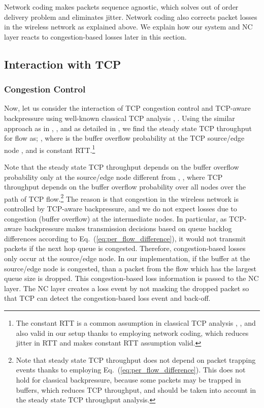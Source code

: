\documentclass[conference]{IEEEtran}
\begin{document}
Network coding makes packets sequence agnostic, which solves out of order delivery problem and eliminates jitter. Network coding also corrects packet losses in the wireless network as explained above. We explain how our system and NC layer reacts to congestion-based losses later in this section.








\subsection{Interaction with TCP}

\subsubsection{Congestion Control}
Now, let us consider the interaction of TCP congestion control and TCP-aware backpressure using well-known classical TCP analysis \cite{twsly_tcp}, \cite{low_tcp}. Using the similar approach as in \cite{twsly_tcp}, \cite{low_tcp}, and as detailed in \cite{tcp_aware_bp_tech_rep}, we find the steady state TCP throughput for flow  as; , where  is the buffer overflow probability at the TCP source/edge node , and  is constant RTT.\footnote{\scriptsize The constant RTT is a common assumption in classical TCP analysis \cite{twsly_tcp}, \cite{low_tcp}, and also valid in our setup thanks to employing network coding, which reduces jitter in RTT and makes constant RTT assumption valid.}

Note that the steady state TCP throughput depends on the buffer overflow probability only at the source/edge node different from \cite{twsly_tcp}, \cite{low_tcp}, where TCP throughput depends on the buffer overflow probability over all nodes over the path of TCP flow.\footnote{\scriptsize Note that steady state TCP throughput does not depend on packet trapping events thanks to employing Eq.~(\ref{eq:per_flow_difference}). This does not hold for classical backpressure, because some packets may be trapped in buffers, which reduces TCP throughput, and should be taken into account in the steady state TCP throughput analysis.} The reason is that congestion in the wireless network is controlled by TCP-aware backpressure, and we do not expect losses due to congestion (buffer overflow) at the intermediate nodes. In particular, as TCP-aware backpressure makes transmission decisions based on queue backlog differences according to Eq.~(\ref{eq:per_flow_difference}), it would not transmit packets if the next hop queue is congested. Therefore, congestion-based losses only occur at the source/edge node. In our implementation, if the buffer at the source/edge node is congested, than a packet from the flow which has the largest queue size is dropped. This congestion-based loss information is passed to the NC layer. The NC layer creates a loss event by not masking the dropped packet so that TCP can detect the congestion-based loss event and back-off. 
\end{document}
